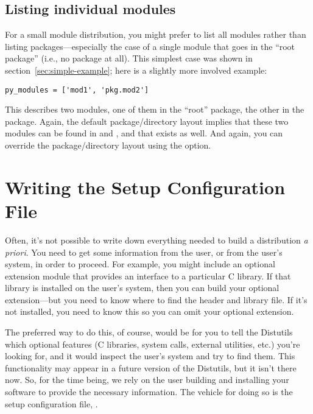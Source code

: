 \documentclass{howto}
\begin{document}
\subsection{Listing individual modules}
\label{sec:listing-modules}

For a small module distribution, you might prefer to list all modules
rather than listing packages---especially the case of a single module
that goes in the ``root package'' (i.e., no package at all).  This
simplest case was shown in section~\ref{sec:simple-example}; here is a
slightly more involved example:
\begin{verbatim}
py_modules = ['mod1', 'pkg.mod2']
\end{verbatim}
This describes two modules, one of them in the ``root'' package, the
other in the  package.  Again, the default package/directory
layout implies that these two modules can be found in  and
, and that  exists as well.
And again, you can override the package/directory layout using the
 option.  


\section{Writing the Setup Configuration File}
\label{sec:setup-config}


Often, it's not possible to write down everything needed to build a
distribution \emph{a priori}.  You need to get some information from the
user, or from the user's system, in order to proceed.  For example, you
might include an optional extension module that provides an interface to
a particular C library.  If that library is installed on the user's
system, then you can build your optional extension---but you need to
know where to find the header and library file.  If it's not installed,
you need to know this so you can omit your optional extension.

The preferred way to do this, of course, would be for you to tell the
Distutils which optional features (C libraries, system calls, external
utilities, etc.) you're looking for, and it would inspect the user's
system and try to find them.  This functionality may appear in a future
version of the Distutils, but it isn't there now.  So, for the time
being, we rely on the user building and installing your software to
provide the necessary information.  The vehicle for doing so is the
setup configuration file, .
\end{document}
